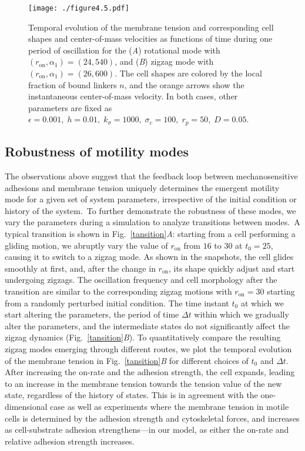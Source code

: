 \documentclass[12pt]{article}
\begin{document}
\begin{figure}[t]
    \centering
    \texttt{[image: ./figure4.5.pdf]}
    \caption{Temporal evolution of the membrane tension and corresponding cell shapes and center-of-mass velocities as functions of time during one period of oscillation for the (\textit{A}) rotational mode with  $(r_{\text{on}},\alpha_1) = (24,540)$, and (\textit{B}) zigzag mode with $(r_{\text{on}},\alpha_1) = (26,600)$. The cell shapes are colored by the local fraction of bound linkers $n$, and the orange arrows show the instantaneous center-of-mass velocity.
    In both cases, other parameters are fixed as $\epsilon = 0.001,\;h=0.01,\;k_\sigma=1000,\;\sigma_c=100,\;r_p=50,\;D=0.05$.}
    \label{fig: tension and shape}
\end{figure}

\subsection*{Robustness of motility modes} 
The observations above suggest that the feedback loop between mechanosensitive adhesions and membrane tension uniquely determines the emergent motility mode for a given set of system parameters, irrespective of the initial condition or history of the system.\ 
To further demonstrate the robustness of these modes, we vary the parameters during a simulation to analyze transitions between modes.\ 
A typical transition is shown in Fig.~\ref{tansition}\textit{A}: starting from a cell performing a gliding motion, we abruptly vary the value of $r_{\text{on}}$ from $16$ to $30$ at $t_0=25$, causing it to switch to a zigzag mode.  
As shown in the snapshots, the cell glides smoothly at first, and, after the change in $r_{\text{on}}$, its shape quickly adjust and start undergoing zigzags. 
The oscillation frequency and cell morphology after the transition are similar to the corresponding zigzag motions with $r_{\text{on}}=30$ starting from a randomly perturbed initial condition. 
The time instant $t_0$ at which we start altering the parameters, the period of time $\Delta t$ within which we gradually alter the parameters, and the intermediate states do not significantly affect the zigzag dynamics (Fig.~\ref{tansition}\textit{B}). 
To quantitatively compare the resulting zigzag modes emerging through different routes, we plot the temporal evolution of the membrane tension in Fig.~\ref{tansition}\textit{B} for different choices of $t_0$ and $\Delta t$. 
After increasing the on-rate and the adhesion strength, the cell expands, leading to an increase in the membrane tension towards the tension value of the new state, regardless of the history of states. 
This is in agreement with the one-dimensional case \cite{sens2020stick} as well as experiments \cite{lieber2013membrane} where the membrane tension in motile cells is determined by the adhesion strength and cytoskeletal forces, and increases as cell-substrate adhesion strengthens---in our model, as either the on-rate and relative adhesion strength increases. 
\end{document}
